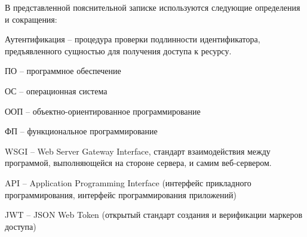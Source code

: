 
В представленной пояснительной записке используются следующие определения и сокращения:

Аутентификация -- процедура проверки подлинности идентификатора, предъявленного сущностью для получения доступа к ресурсу.

ПО -- программное обеспечение

ОС -- операционная система

ООП -- объектно-ориентированное программирование

ФП -- функциональное программирование

WSGI -- Web Server Gateway Interface, стандарт взаимодействия между программой, выполняющейся на стороне сервера, и самим веб-сервером.

API -- Application Programming Interface (интерфейс прикладного программирования, интерфейс программирования приложений)

JWT -- JSON Web Token (открытый стандарт создания и верификации маркеров доступа)

\clearpage